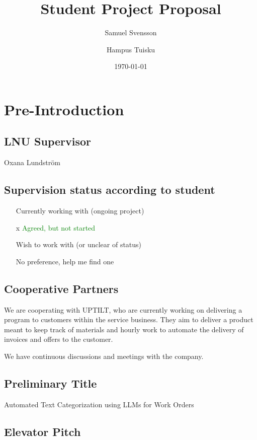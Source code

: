 \documentclass{article}
\title{Student Project Proposal}
\author{Samuel Svensson \and Hampus Tuisku}
\date{\today}
\begin{document}
\maketitle

\section{Pre-Introduction}

\subsection{LNU Supervisor}
Oxana Lundström

\subsection{Supervision status according to student}

\begin{itemize}
      \item [ ] Currently working with (ongoing project)
      \item [x] \textcolor{green}{Agreed, but not started}
      \item [ ] Wish to work with (or unclear of status)
      \item [ ] No preference, help me find one
\end{itemize}

\subsection{Cooperative Partners}

We are cooperating with UPTILT, who are currently working on delivering a program
to customers within the service business.
They aim to deliver a product meant to keep track of materials and hourly work
to automate the delivery of invoices and offers to the customer.

We have continuous discussions and meetings with the company.

\subsection{Preliminary Title}

Automated Text Categorization using LLMs for Work Orders

\subsection{Elevator Pitch}
\end{document}
